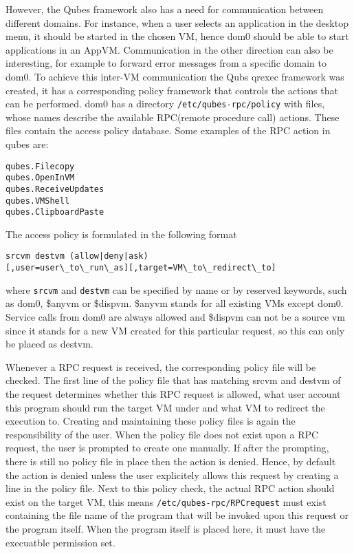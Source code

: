 \documentclass[runningheads,a4paper]{article}
\begin{document}
However, the Qubes framework also has a need for communication between
different domains. For instance, when a user selects an application in
the desktop menu, it should be started in the chosen VM, hence dom0
should be able to start applications in an AppVM. Communication in the
other direction can also be interesting, for example to forward error
messages from a specific domain to dom0. To achieve this inter-VM
communication the Qubs qrexec framework was created, it has a
corresponding policy framework that controls the actions that can be
performed. dom0 has a directory \texttt{/etc/qubes-rpc/policy} with
files, whose names describe the available RPC(remote procedure call)
actions. These files contain the access policy database. Some examples
of the RPC action in qubes are:
\begin{verbatim}
qubes.Filecopy
qubes.OpenInVM
qubes.ReceiveUpdates
qubes.VMShell
qubes.ClipboardPaste
\end{verbatim} 
The access policy is formulated in the following format
\begin{verbatim}
srcvm destvm (allow|deny|ask)
[,user=user\_to\_run\_as][,target=VM\_to\_redirect\_to]
\end{verbatim}
where \texttt{srcvm} and \texttt{destvm} can be specified by name or
by reserved keywords, such as dom0, \$anyvm or \$dispvm. \$anyvm
stands for all existing VMs except dom0. Service calls
from dom0 are always allowed and \$dispvm can not be a source vm since
it stands for a new VM created for this particular request, so this
can only be placed as destvm.

Whenever a RPC request is received, the corresponding policy file will
be checked. The first line of the policy file that has matching srcvm
and destvm of the request determines whether this RPC request is
allowed, what user account this program should run the target VM under
and what VM to redirect the execution to. Creating and maintaining
these policy files is again the responsibility of the user. When the
policy file does not exist upon a RPC request, the user is prompted to
create one manually. If after the prompting, there is still no policy
file in place then the action is denied. Hence, by default the action
is denied unless the user explicitely allows this request by creating
a line in the policy file. Next to this policy check,
the actual RPC action should exist on the target VM, this means
\texttt{/etc/qubes-rpc/RPCrequest} must exist containing the file name
of the program that will be invoked upon this request or the
program itself. When the program itself is placed here, it must have
the execuatble permission set. %
\end{document}
